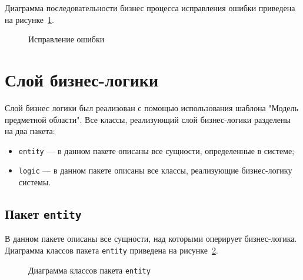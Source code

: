 Диаграмма последовательности бизнес процесса исправления ошибки приведена на рисунке~\ref{fig:sequenceReport}.
\begin{figure}[h]
\caption{Исправление ошибки}
\label{fig:sequenceReport}
\end{figure}

\section{Слой бизнес-логики}
Слой бизнес логики был реализован с помощью использования шаблона "Модель предметной области". Все классы, реализующий слой бизнес-логики разделены на два пакета:
\begin{itemize}
\item \texttt{entity} --- в данном пакете описаны все сущности, определенные в системе;
\item \texttt{logic} --- в данном пакете описаны все классы, реализующие бизнес-логику системы.
\end{itemize}

\subsection{Пакет \texttt{entity}}
В данном пакете описаны все сущности, над которыми оперирует бизнес-логика. Диаграмма классов пакета \texttt{entity} приведена на рисунке~\ref{fig:entityDiagram}.
\begin{figure}[h]
\caption{Диаграмма классов пакета \texttt{entity}}
\label{fig:entityDiagram}
\end{figure}

